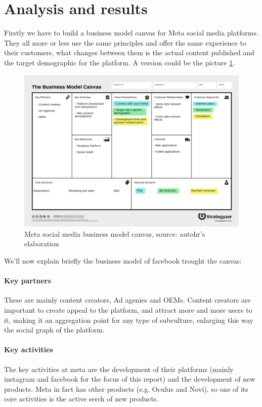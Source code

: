 \section{Analysis and results}\label{sec:analysis}
Firstly we have to build a business model canvas for Meta social media
platforms. They all more or less use the same principles and offer the
same experience to their customers, what changes between them is the
actual content published and the target demographic for the platform.
A version could be the picture \ref{fig:fbcanvas}.

\begin{figure}[ht]
  \centering
  \includegraphics[width=.8\textwidth]{images/fbcanvas.png}
  \caption{Meta social media business model canvas, source: autohr's
    elaboration}
  \label{fig:fbcanvas}
\end{figure}

We'll now explain briefly the business model of facebook trought the
canvas:

\paragraph{Key partners}
These are mainly content creators, Ad agenies and OEMs. Content
creators are important to create appeal to the platform, and attract
more and more users to it, making it an aggregation point for any type
of subculture, enlarging this way the social graph of the platform.

\paragraph{Key activities}
The key activities at meta are the development of their platforms
(mainly instagram and facebook for the focus of this report) and the
development of new products. Meta in fact has other products
(e.g. Oculus and Novi), so one of its core activities is the active
serch of new products.

